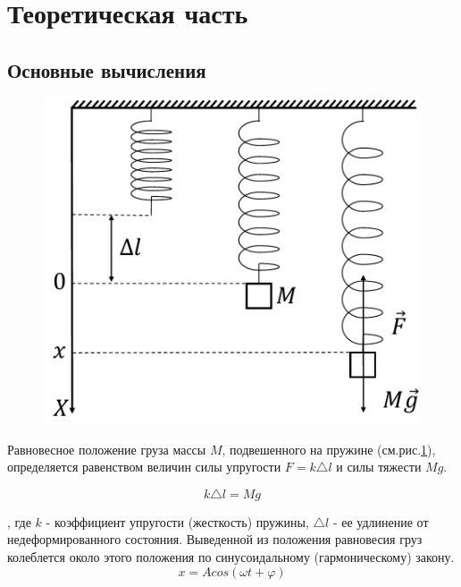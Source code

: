 \section{Теоретическая часть}



\subsection{Основные вычисления}
\begin{figure}
	\centering
	\includegraphics[width=1\linewidth]{img/ris2}
	\caption{ }
	\label{fig: 12}
\end{figure}
Равновесное положение груза массы $M$, подвешенного на пружине (см.рис.\ref{fig: 12}), определяется равенством величин силы упругости $F = k \triangle l$ и силы тяжести $Mg$.


\begin{equation}
	\label{eqution:1}
	k \triangle l = Mg
\end{equation}

, где $k$ - коэффициент упругости (жесткость) пружины, $\triangle l$ - ее удлинение от недеформированного состояния. Выведенной из положения равновесия груз колеблется около этого положения по синусоидальному (гармоническому) закону. 
\begin{equation}
	\label{eqution:2}
	x = Acos(\omega t + \varphi) 
\end{equation}

